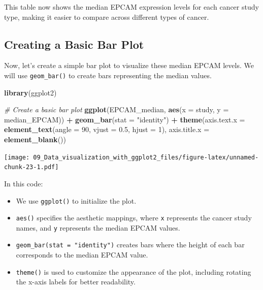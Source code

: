 \documentclass[
]{book}
\newenvironment{Shaded}{\begin{snugshade}}{\end{snugshade}}
\newcommand{\AttributeTok}[1]{\textcolor[rgb]{0.13,0.29,0.53}{#1}}
\newcommand{\CommentTok}[1]{\textcolor[rgb]{0.56,0.35,0.01}{\textit{#1}}}
\newcommand{\DecValTok}[1]{\textcolor[rgb]{0.00,0.00,0.81}{#1}}
\newcommand{\FloatTok}[1]{\textcolor[rgb]{0.00,0.00,0.81}{#1}}
\newcommand{\FunctionTok}[1]{\textcolor[rgb]{0.13,0.29,0.53}{\textbf{#1}}}
\newcommand{\NormalTok}[1]{#1}
\newcommand{\SpecialCharTok}[1]{\textcolor[rgb]{0.81,0.36,0.00}{\textbf{#1}}}
\newcommand{\StringTok}[1]{\textcolor[rgb]{0.31,0.60,0.02}{#1}}
\begin{document}
This table now shows the median EPCAM expression levels for each cancer study type, making it easier to compare across different types of cancer.

\hypertarget{creating-a-basic-bar-plot}{%
\subsection{Creating a Basic Bar Plot}\label{creating-a-basic-bar-plot}}

Now, let's create a simple bar plot to visualize these median EPCAM levels. We will use \texttt{geom\_bar()} to create bars representing the median values.

\begin{Shaded}
\begin{Highlighting}[]
\FunctionTok{library}\NormalTok{(ggplot2)}

\CommentTok{\# Create a basic bar plot}
\FunctionTok{ggplot}\NormalTok{(EPCAM\_median, }\FunctionTok{aes}\NormalTok{(}\AttributeTok{x =}\NormalTok{ study, }\AttributeTok{y =}\NormalTok{ median\_EPCAM)) }\SpecialCharTok{+}
  \FunctionTok{geom\_bar}\NormalTok{(}\AttributeTok{stat =} \StringTok{"identity"}\NormalTok{) }\SpecialCharTok{+}
  \FunctionTok{theme}\NormalTok{(}\AttributeTok{axis.text.x =} \FunctionTok{element\_text}\NormalTok{(}\AttributeTok{angle =} \DecValTok{90}\NormalTok{, }\AttributeTok{vjust =} \FloatTok{0.5}\NormalTok{, }\AttributeTok{hjust =} \DecValTok{1}\NormalTok{),}
        \AttributeTok{axis.title.x =} \FunctionTok{element\_blank}\NormalTok{())}
\end{Highlighting}
\end{Shaded}

\texttt{[image: 09\_Data\_visualization\_with\_ggplot2\_files/figure-latex/unnamed-chunk-23-1.pdf]}

In this code:

\begin{itemize}
\item
  We use \texttt{ggplot()} to initialize the plot.
\item
  \texttt{aes()} specifies the aesthetic mappings, where \texttt{x} represents the cancer study names, and \texttt{y} represents the median EPCAM values.
\item
  \texttt{geom\_bar(stat\ =\ "identity")} creates bars where the height of each bar corresponds to the median EPCAM value.
\item
  \texttt{theme()} is used to customize the appearance of the plot, including rotating the x-axis labels for better readability.
\end{itemize}
\end{document}
